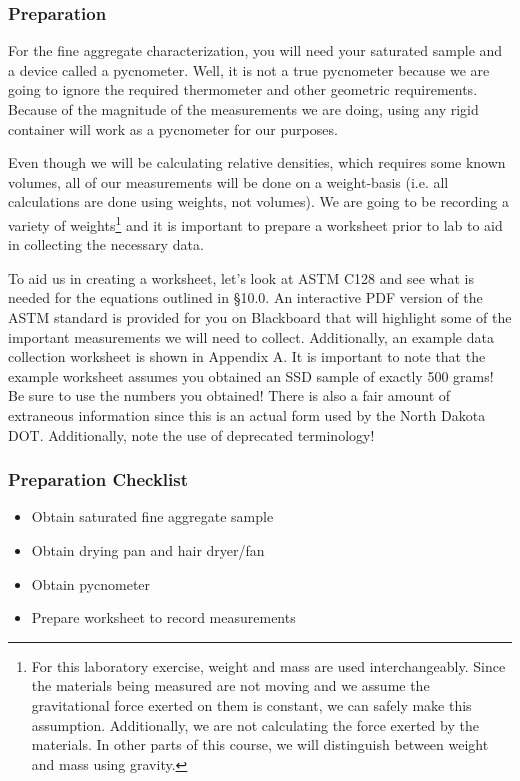 \documentclass[12pt]{article}
\begin{document}
\subsubsection{Preparation}
For the fine aggregate characterization, you will need your saturated sample and a device called a pycnometer. Well, it is not a true pycnometer because we are going to ignore the required thermometer and other geometric requirements. Because of the magnitude of the measurements we are doing, using any rigid container will work as a pycnometer for our purposes.

Even though we will be calculating relative densities, which requires some known volumes, all of our measurements will be done on a weight-basis (i.e. all calculations are done using weights, not volumes). We are going to be recording a variety of weights\footnote{For this laboratory exercise, weight and mass are used interchangeably. Since the materials being measured are not moving and we assume the gravitational force exerted on them is constant, we can safely make this assumption. Additionally, we are not calculating the force exerted by the materials. In other parts of this course, we will distinguish between weight and mass using gravity.} and it is important to prepare a worksheet prior to lab to aid in collecting the necessary data.

To aid us in creating a worksheet, let's look at ASTM C128 and see what is needed for the equations outlined in \S 10.0. An interactive PDF version of the ASTM standard is provided for you on Blackboard that will highlight some of the important measurements we will need to collect. Additionally, an example data collection worksheet is shown in Appendix A. It is important to note that the example worksheet assumes you obtained an SSD sample of exactly 500 grams! Be sure to use the numbers you obtained! There is also a fair amount of extraneous information since this is an actual form used by the North Dakota DOT. Additionally, note the use of deprecated terminology!

\subsubsection*{Preparation Checklist}
\begin{itemize}
    \item Obtain saturated fine aggregate sample
    \item Obtain drying pan and hair dryer/fan
    \item Obtain pycnometer
    \item Prepare worksheet to record measurements
\end{itemize}
\end{document}
